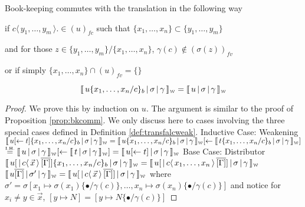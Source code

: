 \documentclass[a4paper,UKenglish,cleveref, autoref]{lipics-v2019}
\newcommand{\fv}[1]{(#1)_{fv}}
\newcommand{\fc}[1]{(#1)_{fc}}
\newcommand{\set}[1]{ \{ #1 \} }
\newcommand{\fake}[3]{#1 \langle \, #2 \, \rangle . #3}
\newcommand{\share}[3]{#1 [#2 \leftarrow #3]}
\newcommand{\dist}[5]{#1 [ #2 \, \vert \, \fakedist{#4}{#5} \, #3 ]}
\newcommand{\fakedist}[2]{#1 \langle \, #2 \, \rangle}
\newcommand{\sub}[3]{#1 \{ #2 / #3 \}}
\newcommand{\psub}[3]{#1 \{ #2 / #3 \}_{b}}
\newcommand{\weaksymbol}{\mbox{\tiny $\mathcal{W}$}}
\newcommand{\readweakwmap}[3]{\llbracket \, #1 \, \vert \, #2 \, \vert \, #3  \, \rrbracket_{\weaksymbol} }
\newcommand{\IH}{\stackrel{\hbox{\tiny I.H.}}{\hbox{=}}}
\begin{document}
\begin{proposition}
\label{prop:bkcommweak}
Book-keeping commutes with the translation in the following way

if $\fake{c}{y_{1}, \dots, y_{m}} \in \fc{u}$ such that $\set{x_{1}, \dots, x_{n}} \subset \set{y_{1}, \dots, y_{m}}$

and for those $z \in \set{y_{1}, \dots, y_{m}} / \set{x_{1}, \dots, x_{n}}$, $\gamma(c) \not\in \fv{\sigma(z)}$

or if simply $\set{x_{1}, \dots, x_{n}} \cap \fv{u} = \set{}$

$$\readweakwmap{u \psub{}{x_{1}, \dots, x_{n}}{c}}{\sigma}{\gamma} = \readweakwmap{u}{\sigma}{\gamma}$$

\end{proposition}

\begin{proof}
We prove this by induction on $u$. The argument is similar to the proof of Proposition \ref{prop:bkcomm}. We only discuss here to cases involving the three special cases defined in Definition \ref{def:transfalcweak}.
\newline
\newline
Inductive Case: Weakening
\newline
$\readweakwmap{\share{u}{}{t} \psub{}{x_{1}, \dots, x_{n}}{c}}{\sigma}{\gamma} = \share{\readweakwmap{u \psub{}{x_{1}, \dots, x_{n}}{c}}{\sigma}{\gamma}}{}{\readweakwmap{t \psub{}{x_{1}, \dots, x_{n}}{c}}{\sigma}{\gamma}}$
\newline
$\IH \share{\readweakwmap{u}{\sigma}{\gamma}}{}{\readweakwmap{t}{\sigma}{\gamma}} = \readweakwmap{\share{u}{}{t}}{\sigma}{\gamma}$
\newline
\newline
Base Case: Distributor
\newline
$\readweakwmap{\dist{u}{}{\overline{[\Gamma]}}{c}{\vec{x}} \psub{}{x_{1}, \dots, x_{n}}{c}}{\sigma}{\gamma} = \readweakwmap{\dist{u}{}{\overline{[\Gamma]}}{c}{x_{1}, \dots, x_{n}} }{\sigma}{\gamma}$
\newline
$\readweakwmap{u \overline{[\Gamma]}}{\sigma'}{\gamma} = \readweakwmap{\dist{u}{}{\overline{[\Gamma]}}{c}{\vec{x}}}{\sigma}{\gamma}$
\newline
where
$\sigma' = \sigma [x_{1} \mapsto \sigma(x_{1})\sub{}{\bullet}{\gamma(c)}, \dots, x_{n} \mapsto \sigma(x_{n}) \sub{}{\bullet}{\gamma(c)}]$
\newline
and notice for $x_{i} \neq y \in \vec{x}$, $[y \mapsto N] = [y \mapsto N \sub{}{\bullet}{\gamma(c)}]$
\newline

\end{proof}
\end{document}

